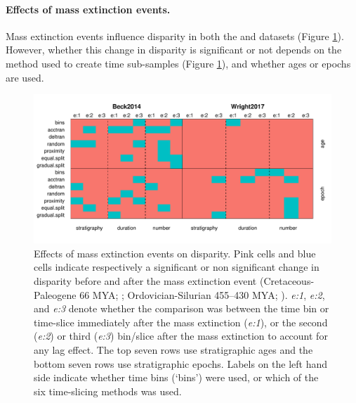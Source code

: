 \documentclass[12pt,a4paper]{article}
\begin{document}

\paragraph{Effects of mass extinction events.}
Mass extinction events influence disparity in both the \cite{beckancient2014} and \cite{wright2017bayesian} datasets (Figure \ref{figure:extinction1}).
However, whether this change in disparity is significant or not depends on the method used to create time sub-samples (Figure \ref{figure:extinction1}), and whether ages or epochs are used. 

  \begin{figure}[!htbp]
    \centering
    \includegraphics[width=1\linewidth, height=1\textheight, keepaspectratio]{figures/fig-extinction-effect.pdf}
    \caption[Extinction example datasets.]
    {Effects of mass extinction events on disparity.
    Pink cells and blue cells indicate respectively a significant or non significant change in disparity before and after the mass extinction event (Cretaceous-Paleogene 66 MYA; \citealt{beckancient2014}; Ordovician-Silurian 455–430 MYA; \citealt{wright2017bayesian}).
    \textit{e:1}, \textit{e:2}, and \textit{e:3} denote whether the comparison was between the time bin or time-slice immediately after the mass extinction (\textit{e:1}), or the second (\textit{e:2}) or third (\textit{e:3}) bin/slice after the mass extinction to account for any lag effect.
    The top seven rows use stratigraphic ages and the bottom seven rows use stratigraphic epochs.
    Labels on the left hand side indicate whether time bins (`bins') were used, or which of the six time-slicing methods was used.}
    \label{figure:extinction1}
  \end{figure}
\end{document}

